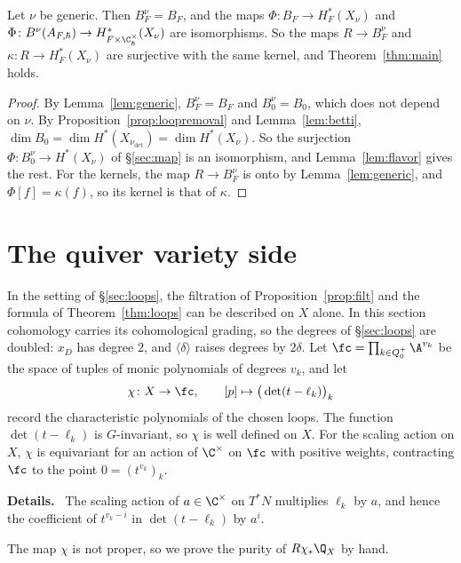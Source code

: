 \documentclass[11pt]{amsart}
\newenvironment{details}{\par\color{black!60!green}\noindent\textbf{Details.}\ }{\par}
\begin{document}
\begin{theorem}\label{thm:classical}
Let $\nu$ be generic.  Then $B^\nu_F=B_F$, and the maps
$\Phi\colon B_F\to H^*_F(X_\nu)$ and
$\Phi\colon B^\nu(A_{F,\hbar})\to H^*_{F\times\C^\times_\hbar}(X_\nu)$ are
isomorphisms.  So the maps $R\to B^\nu_F$ and $\kappa\colon R\to H^*_F(X_\nu)$
are surjective with the same kernel, and Theorem~\ref{thm:main} holds.
\end{theorem}

\begin{proof}
By Lemma~\ref{lem:generic}, $B^\nu_F=B_F$ and $B^\nu_0=B_0$, which does not
depend on $\nu$.  By Proposition~\ref{prop:loopremoval} and
Lemma~\ref{lem:betti}, $\dim B_0=\dim H^*(X_{\nu_{\det}})=\dim H^*(X_\nu)$.  So
the surjection $\Phi\colon B^\nu_0\to H^*(X_\nu)$ of \S\ref{sec:map} is an
isomorphism, and Lemma~\ref{lem:flavor} gives the rest.  For the kernels,
the map $R\to B^\nu_F$ is onto by
Lemma~\ref{lem:generic}, and $\Phi[f]=\kappa(f)$, so its kernel is that of
$\kappa$.
\end{proof}



\section{The quiver variety side}\label{sec:higgs}
In the setting of \S\ref{sec:loops}, the filtration of
Proposition~\ref{prop:filt} and the formula of Theorem~\ref{thm:loops} can
be described on $X$ alone.  In this section cohomology carries its
cohomological grading, so the degrees of \S\ref{sec:loops} are doubled: $x_D$
has degree $2$, and $\langle\delta\rangle$ raises degrees by $2\delta$.  Let $\fc=\prod_{k\in Q_0^+}\A^{v_k}$ be the
space of tuples of monic polynomials of degrees $v_k$, and let
\[
 \chi\colon X\to\fc,\qquad [p]\mapsto\big(\det(t-\ell_k)\big)_k
\]
record the characteristic polynomials of the chosen loops.  The function
$\det(t-\ell_k)$ is $G$-invariant, so $\chi$ is well defined on $X$.  For the
scaling action on $X$, $\chi$ is equivariant for an action of $\C^\times$ on
$\fc$ with positive weights, contracting $\fc$ to the point $0=(t^{v_k})_k$.
\begin{details}
The scaling action of $a\in\C^\times$ on $T^*N$ multiplies $\ell_k$ by
$a$, and hence the coefficient of $t^{v_k-i}$ in $\det(t-\ell_k)$ by $a^i$.
\end{details}
The map $\chi$ is
not proper, so we prove the purity of $R\chi_*\Q_X$ by hand.
\end{document}

